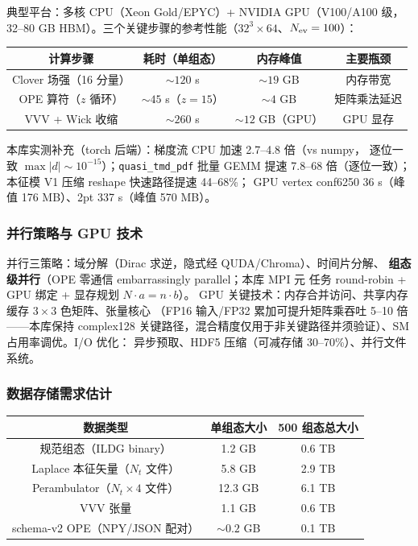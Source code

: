 \documentclass[11pt,a4paper]{ctexart}
\newcommand{\code}[1]{\texttt{#1}}
\begin{document}
典型平台：多核 CPU（Xeon Gold/EPYC）+ NVIDIA GPU（V100/A100 级，32--80
GB HBM）。三个关键步骤的参考性能（$32^3\times64$、$N_{\rm ev}=100$）：

\begin{center}
\begin{tabular}{c c c c}
\toprule
\textbf{计算步骤} & \textbf{耗时（单组态）} & \textbf{内存峰值} &
\textbf{主要瓶颈} \\
\midrule
Clover 场强（16 分量） & $\sim120$ s & $\sim19$ GB & 内存带宽 \\
OPE 算符（$z$ 循环） & $\sim45$ s（$z=15$） & $\sim4$ GB & 矩阵乘法延迟 \\
VVV + Wick 收缩 & $\sim260$ s & $\sim12$ GB（GPU） & GPU 显存 \\
\bottomrule
\end{tabular}
\end{center}
本库实测补充（torch 后端）：梯度流 CPU 加速 2.7--4.8 倍（vs numpy，
逐位一致 $\max|d|\sim10^{-15}$）；\code{quasi\_tmd\_pdf} 批量 GEMM 提速
7.8--68 倍（逐位一致）；本征模 V1 压缩 reshape 快速路径提速 44--68\%；
GPU vertex conf6250 36 s（峰值 176 MB）、2pt 337 s（峰值 570 MB）。

\subsubsection{并行策略与 GPU 技术}

并行三策略：域分解（Dirac 求逆，隐式经 QUDA/Chroma）、时间片分解、
\textbf{组态级并行}（OPE 零通信 embarrassingly parallel；本库 MPI 元
任务 round-robin + GPU 绑定 + 显存规划 $N\cdot a=n\cdot b$）。
GPU 关键技术：内存合并访问、共享内存缓存 $3\times3$ 色矩阵、张量核心
（FP16 输入/FP32 累加可提升矩阵乘吞吐 5--10 倍——本库保持 complex128
关键路径，混合精度仅用于非关键路径并须验证）、SM 占用率调优。I/O 优化：
异步预取、HDF5 压缩（可减存储 30--70\%）、并行文件系统。

\subsubsection{数据存储需求估计}

\begin{center}
\begin{tabular}{c c c}
\toprule
\textbf{数据类型} & \textbf{单组态大小} & \textbf{500 组态总大小} \\
\midrule
规范组态（ILDG binary） & 1.2 GB & 0.6 TB \\
Laplace 本征矢量（$N_t$ 文件） & 5.8 GB & 2.9 TB \\
Perambulator（$N_t\times4$ 文件） & 12.3 GB & 6.1 TB \\
VVV 张量 & 1.1 GB & 0.6 TB \\
schema-v2 OPE（NPY/JSON 配对） & $\sim0.2$ GB & 0.1 TB \\
\bottomrule
\end{tabular}
\end{center}
\end{document}
